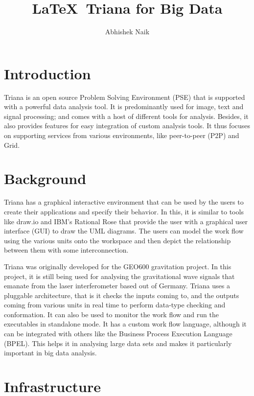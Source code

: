 \documentclass[9pt,twocolumn,twoside]{styles/osajnl}
\title{\LaTeX\ Triana for Big Data}
\author{Abhishek Naik}
\affil[1]{School of Informatics and Computing, Bloomington, IN 47408, U.S.A.}
\affil[*]{Corresponding authors: ahnaik@indiana.edu}
\begin{document}
\maketitle

\section{Introduction}

Triana is an open source Problem Solving Environment (PSE) that is
supported with a powerful data analysis tool.  It is predominantly
used for image, text and signal processing; and comes with a host of
different tools for analysis.  Besides, it also provides features for
easy integration of custom analysis tools.  It thus focuses on
supporting services from various environments, like peer-to-peer (P2P)
and Grid.

\section{Background}
\cite{TrianaDocumentation1} Triana has a graphical interactive
environment that can be used by the users to create their applications
and specify their behavior.  In this, it is similar to tools like
\cite{DrawIO} draw.io and \cite{IBM-Rational-Rose} IBM's Rational Rose
that provide the user with a graphical user interface (GUI) to draw
the UML diagrams.  The users can model the work flow using the various
units onto the workspace and then depict the relationship between them
with some interconnection.

\cite{TrianaGEO600} Triana was originally developed for the GEO600
gravitation project.  In this project, it is still being used for
analysing the gravitational wave signals that emanate from the laser
interferometer based out of Germany.  \cite{TrianaDocumentation2}
Triana uses a pluggable architecture, that is it checks the inputs
coming to, and the outputs coming from various units in real time to
perform data-type checking and conformation.  It can also be used to
monitor the work flow and run the executables in standalone mode.
\cite{RMBDP-Book} It has a custom work flow language, although it can
be integrated with others like the Business Process Execution Language
(BPEL).  This helps it in analysing large data sets and makes it
particularly important in big data analysis.

\section{Infrastructure}
\end{document}
